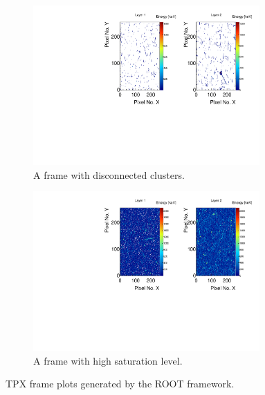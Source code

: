 \begin{figure}[t]
\begin{center}
    \begin{subfigure}{\textwidth}
    \centering
    \includegraphics[width=0.95\textwidth]{figures/frame-not-saturated}
    \caption{A frame with disconnected clusters.}
    \label{fig:frame-not-saturated}
    \end{subfigure}

    \vspace{0.2cm}

    \begin{subfigure}{\textwidth}
    \centering
    \includegraphics[width=0.95\textwidth]{figures/frame-saturated}
    \caption{A frame with high saturation level.}
    \label{fig:frame-saturated}
    \end{subfigure}
\caption{TPX frame plots generated by the ROOT framework.}
\label{fig:tpx-frames}
\end{center}
\end{figure}

